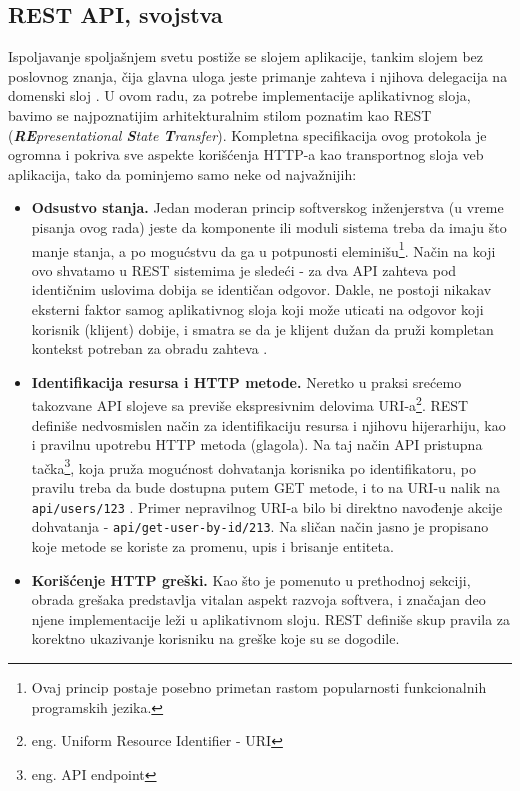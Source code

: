 \documentclass[12pt,oneside]{memoir}
\begin{document}
\subsection{REST API, svojstva}
\label{sec:restapi}

Ispoljavanje spoljašnjem svetu postiže se slojem aplikacije, tankim slojem bez poslovnog znanja, čija glavna uloga jeste primanje zahteva i njihova delegacija na domenski sloj \cite{dddfull}. U ovom radu, za potrebe implementacije aplikativnog sloja, bavimo se najpoznatijim arhitekturalnim stilom poznatim kao REST (\textit{\textbf{RE}presentational \textbf{S}tate \textbf{T}ransfer}). Kompletna specifikacija ovog protokola je ogromna i pokriva sve aspekte korišćenja HTTP-a kao transportnog sloja veb aplikacija, tako da pominjemo samo neke od najvažnijih:

\begin{itemize}
    \item \textbf{Odsustvo stanja.} Jedan moderan princip softverskog inženjerstva (u vreme pisanja ovog rada) jeste da komponente ili moduli sistema treba da imaju što manje stanja, a po mogućstvu da ga u potpunosti eleminišu\footnote{Ovaj princip postaje posebno primetan rastom popularnosti funkcionalnih programskih jezika.}. Način na koji ovo shvatamo u REST sistemima je sledeći - za dva API zahteva pod identičnim uslovima dobija se identičan odgovor. Dakle, ne postoji nikakav eksterni faktor samog aplikativnog sloja koji može uticati na odgovor koji korisnik (klijent) dobije, i smatra se da je klijent dužan da pruži kompletan kontekst potreban za obradu zahteva \cite{restapi}.

    \item \textbf{Identifikacija resursa i HTTP metode.} Neretko u praksi srećemo takozvane API slojeve sa previše ekspresivnim delovima URI-a\footnote{eng. Uniform Resource Identifier - URI}. REST definiše nedvosmislen način za identifikaciju resursa i njihovu hijerarhiju, kao i pravilnu upotrebu HTTP metoda (glagola). Na taj način API pristupna tačka\footnote{eng. API endpoint}, koja pruža mogućnost dohvatanja korisnika po identifikatoru, po pravilu treba da bude dostupna putem GET metode, i to na URI-u nalik na \verb|api/users/123| \cite{restapi}. Primer nepravilnog URI-a bilo bi direktno navođenje akcije dohvatanja - \verb|api/get-user-by-id/213|. Na sličan način jasno je propisano koje metode se koriste za promenu, upis i brisanje entiteta.

    \item \textbf{Korišćenje HTTP greški.} Kao što je pomenuto u prethodnoj sekciji, obrada grešaka predstavlja vitalan aspekt razvoja softvera, i značajan deo njene implementacije leži u aplikativnom sloju. REST definiše skup pravila za korektno ukazivanje korisniku na greške koje su se dogodile.  
\end{itemize}
\end{document}
